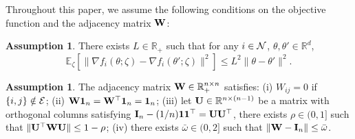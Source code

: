 \documentclass[10pt]{article} %
\newcommand{\revision}{}
\theoremstyle{plain}
\theoremstyle{definition}
\newtheorem{assumption}[theorem]{Assumption}
\theoremstyle{remark}
\newcommand{\RR}{\mathbb{R}}
\newcommand{\bw}{\bar{\omega}}
\newcommand{\norm}[1]{\left\| #1 \right\|}
\newcommand{\W}{{\bf W}}
\newcommand{\U}{{\bf U}}
\newcommand{\I}{{\bf I}}
\begin{document}
Throughout this paper, we assume the following conditions on the objective function and the adjacency matrix ${\bf W}$:
{\revision
\begin{assumption} \label{ass:lips}
    There exists $L \in \mathbb{R}_+$ such that for any $i \in {\cal N}$, $\theta, \theta' \in \RR^d$,
    \begin{equation} \label{eq:lips}
        \mathbb{E}_{\zeta} \left[ \| \nabla f_i( \theta; \zeta ) - \nabla f_i( \theta' ; \zeta ) \|^2 \right] \leq L^2 \| \theta - \theta' \|^2.
    \end{equation}
\end{assumption}
}
\begin{assumption} \label{ass:mix}
The adjacency matrix $\W \in \RR_+^{n \times n}$ satisfies: (i) $W_{ij} = 0$ if $ \{ i,j \} \notin {\cal E}$; (ii) $\W {\bf 1}_n = \W^\top {\bf 1}_n = {\bf 1}_n$; (iii) let $\U \in \RR^{n \times (n-1)}$ be a matrix with orthogonal columns satisfying $\I_n - (1/n) {\bf 1}{\bf 1}^\top = \U \U^\top$, there exists $\rho \in (0,1]$ such that $\| \U^\top \W \U \| \leq 1 - \rho$; (iv) there exists $\bw \in (0,2]$ such that $\norm{ \W - \I_n } \leq \bw$.
\end{assumption}\vspace{-0.0cm}
\end{document}

